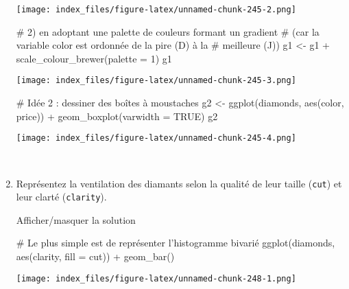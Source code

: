 \documentclass[12pt,]{article}
\newenvironment{Shaded}{}{}
\newcommand{\KeywordTok}[1]{\textcolor[rgb]{0.00,0.00,1.00}{{#1}}}
\newcommand{\DataTypeTok}[1]{{#1}}
\newcommand{\DecValTok}[1]{{#1}}
\newcommand{\StringTok}[1]{\textcolor[rgb]{0.00,0.50,0.50}{{#1}}}
\newcommand{\CommentTok}[1]{\textcolor[rgb]{0.00,0.50,0.00}{{#1}}}
\newcommand{\OtherTok}[1]{\textcolor[rgb]{1.00,0.25,0.00}{{#1}}}
\newcommand{\NormalTok}[1]{{#1}}
\begin{document}
\begin{enumerate}
  \texttt{[image: index\_files/figure-latex/unnamed-chunk-245-2.png]}

\begin{Shaded}
\begin{Highlighting}[]

\CommentTok{# 2) en adoptant une palette de couleurs formant un gradient}
\CommentTok{# (car la variable color est ordonnée de la pire (D) à la }
\CommentTok{# meilleure (J))}
\NormalTok{g1 <-}\StringTok{ }\NormalTok{g1 +}\StringTok{ }\KeywordTok{scale_colour_brewer}\NormalTok{(}\DataTypeTok{palette =} \DecValTok{1}\NormalTok{)}
\NormalTok{g1}
\end{Highlighting}
\end{Shaded}

  \texttt{[image: index\_files/figure-latex/unnamed-chunk-245-3.png]}

\begin{Shaded}
\begin{Highlighting}[]

\CommentTok{# Idée 2 : dessiner des boîtes à moustaches}
\NormalTok{g2 <-}\StringTok{ }\KeywordTok{ggplot}\NormalTok{(diamonds, }\KeywordTok{aes}\NormalTok{(color, price)) +}\StringTok{ }\KeywordTok{geom_boxplot}\NormalTok{(}\DataTypeTok{varwidth =} \OtherTok{TRUE}\NormalTok{)}
\NormalTok{g2}
\end{Highlighting}
\end{Shaded}

  \texttt{[image: index\_files/figure-latex/unnamed-chunk-245-4.png]}

  ~
\item
  Représentez la ventilation des diamants selon la qualité de leur
  taille (\texttt{cut}) et leur clarté (\texttt{clarity}).

  Afficher/masquer la solution

  \hypertarget{sol68}{}
\begin{Shaded}
\begin{Highlighting}[]
\CommentTok{# Le plus simple est de représenter l'histogramme bivarié}
\KeywordTok{ggplot}\NormalTok{(diamonds, }\KeywordTok{aes}\NormalTok{(clarity, }\DataTypeTok{fill =} \NormalTok{cut)) +}\StringTok{ }\KeywordTok{geom_bar}\NormalTok{()}
\end{Highlighting}
\end{Shaded}

  \texttt{[image: index\_files/figure-latex/unnamed-chunk-248-1.png]}

\begin{Shaded}
\begin{Highlighting}[]


\end{Highlighting}
\end{Shaded}
\end{enumerate}
\end{document}
